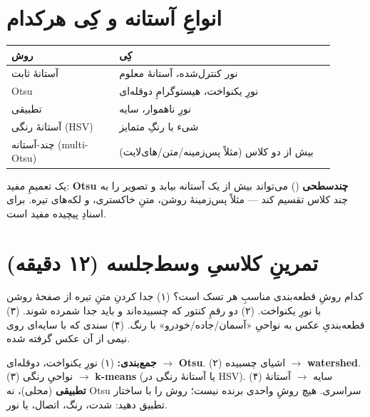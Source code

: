 \documentclass[12pt,a4paper]{article}
\begin{document}
\section{انواعِ آستانه و کِی هرکدام}

\begin{center}
\begin{tabular}{>{\raggedright\arraybackslash}p{0.3\linewidth} >{\raggedright\arraybackslash}p{0.6\linewidth}}
\toprule
\textbf{روش} & \textbf{کِی} \\
\midrule
آستانهٔ ثابت & نور کنترل‌شده، آستانهٔ معلوم \\
Otsu & نورِ یکنواخت، هیستوگرامِ دوقله‌ای \\
تطبیقی & نورِ ناهموار، سایه \\
آستانهٔ رنگی (HSV) & شیء با رنگِ متمایز \\
چند-آستانه (multi-Otsu) & بیش از دو کلاس (مثلاً پس‌زمینه/متن/های‌لایت) \\
\bottomrule
\end{tabular}
\end{center}

\begin{yaddasht}
یک تعمیمِ مفید: \textbf{Otsu چند‌سطحی} () می‌تواند بیش از یک آستانه بیابد و تصویر
را به چند کلاس تقسیم کند — مثلاً پس‌زمینهٔ روشن، متنِ خاکستری، و لکه‌های تیره. برای اسنادِ پیچیده مفید است.
\end{yaddasht}

\section{تمرینِ کلاسیِ وسط‌جلسه (۱۲ دقیقه)}

\begin{tamrin}
کدام روشِ قطعه‌بندی مناسبِ هر تسک است؟ (۱) جدا کردنِ متنِ تیره از صفحهٔ روشن با نورِ یکنواخت. (۲)
دو رقمِ کنتور که چسبیده‌اند و باید جدا شمرده شوند. (۳) قطعه‌بندیِ عکس به نواحیِ «آسمان/جاده/خودرو»
با رنگ. (۴) سندی که با سایه‌ای روی نیمی از آن عکس گرفته شده.
\end{tamrin}

\textbf{جمع‌بندی:} (۱) نورِ یکنواخت، دوقله‌ای $\rightarrow$ \textbf{Otsu}. (۲) اشیای چسبیده
$\rightarrow$ \textbf{watershed}. (۳) نواحیِ رنگی $\rightarrow$ \textbf{k-means} (یا آستانهٔ
رنگی در HSV). (۴) سایه $\rightarrow$ آستانهٔ \textbf{تطبیقی} (محلی)، نه Otsuِ سراسری. هیچ روشِ
واحدی برنده نیست؛ روش را با ساختار تطبیق دهید: شدت، رنگ، اتصال، یا نور.
\end{document}
